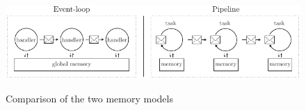 \begin{figure}[h!]
  \centering
  \includegraphics[width=0.8\linewidth]{../resources/models-difference.pdf}
  \label{fig:models-difference}
  \caption{Comparison of the two memory models}
\end{figure}




